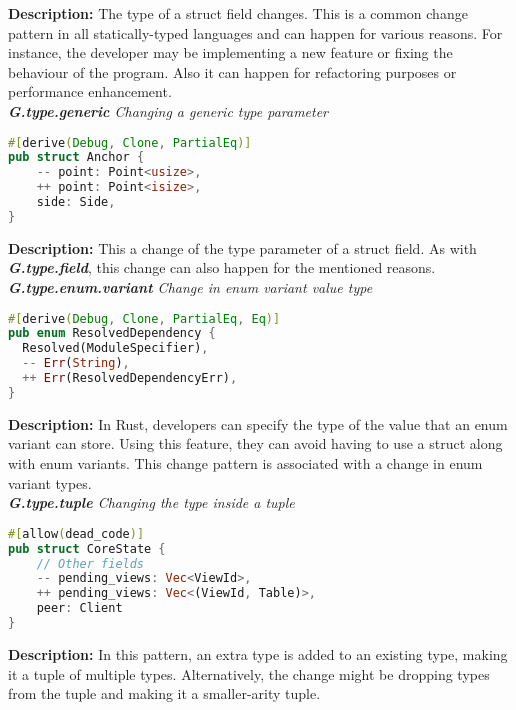 \noindent \textbf{Description:} The type of a struct field changes. This is a common change pattern in all statically-typed languages and can happen for various reasons. For instance, the developer may be implementing a new feature or fixing the behaviour of the program. Also it can happen for refactoring purposes or performance enhancement. \\

\noindent \textit{ \textbf{G.type.generic} Changing a generic type parameter}

\begin{lstlisting}[language=Rust, style=colouredRust]
#[derive(Debug, Clone, PartialEq)]
pub struct Anchor {
    -- point: Point<usize>,
    ++ point: Point<isize>,
    side: Side,
}

\end{lstlisting}

\noindent \textbf{Description:} This a change of the type parameter of a struct field. As with \textit{\textbf{G.type.field}}, this change can also happen for the mentioned reasons. \\

\noindent \textit{ \textbf{G.type.enum.variant} Change in enum variant value type}

\begin{lstlisting}[language=Rust, style=colouredRust]
#[derive(Debug, Clone, PartialEq, Eq)]
pub enum ResolvedDependency {
  Resolved(ModuleSpecifier),
  -- Err(String),
  ++ Err(ResolvedDependencyErr),
}

\end{lstlisting}

\noindent \textbf{Description:} In Rust, developers can specify the type of the value that an enum variant can store. Using this feature, they can avoid having to use a struct along with enum variants. This change pattern is associated with a change in enum variant types. \\


\noindent \textit{ \textbf{G.type.tuple} Changing the type inside a tuple}

\begin{lstlisting}[language=Rust, style=colouredRust]
#[allow(dead_code)]
pub struct CoreState {
    // Other fields
    -- pending_views: Vec<ViewId>,
    ++ pending_views: Vec<(ViewId, Table)>,
    peer: Client
}
\end{lstlisting}



\noindent \textbf{Description:} In this pattern, an extra type is added to an existing type, making it a tuple of multiple types. Alternatively, the change might be dropping types from the tuple and making it a smaller-arity tuple.

